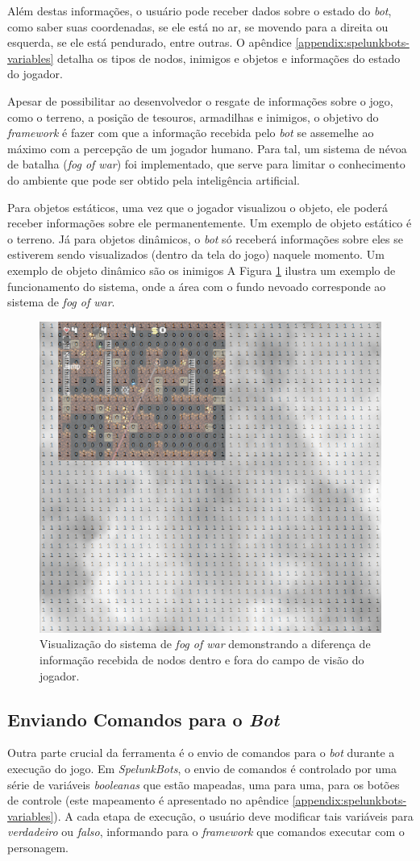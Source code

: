 Além destas informações, o usuário pode receber dados sobre o estado do
\textit{bot}, como saber suas coordenadas, se ele está no ar, se movendo para a
direita ou esquerda, se ele está pendurado, entre outras. O apêndice
\ref{appendix:spelunkbots-variables} detalha os tipos de nodos, inimigos e
objetos e informações do estado do jogador.

Apesar de possibilitar ao desenvolvedor o resgate de informações sobre o jogo,
como o terreno, a posição de tesouros, armadilhas e inimigos, o objetivo do
\textit{framework} é fazer com que a informação recebida pelo \textit{bot} se
assemelhe ao máximo com a percepção de um jogador humano. Para tal, um sistema
de névoa de batalha (\textit{fog of war}) foi implementado, que serve para
limitar o conhecimento do ambiente que pode ser obtido pela inteligência
artificial.

Para objetos estáticos, uma vez que o jogador visualizou o objeto, ele poderá
receber informações sobre ele permanentemente. Um exemplo de objeto estático é o
terreno. Já para objetos dinâmicos, o \textit{bot} só receberá informações sobre
eles se estiverem sendo visualizados (dentro da tela do jogo) naquele momento.
Um exemplo de objeto dinâmico são os inimigos A Figura \ref{fig:spelunkbots-fow}
ilustra um exemplo de funcionamento do sistema, onde a área com o fundo nevoado
corresponde ao sistema de \textit{fog of war}.

\begin{figure}[htb!]
\centering
\includegraphics[width=.60\textwidth]{fig/spelunkbots-fow.png}
\caption {Visualização do sistema de \textit{fog of war} demonstrando a
diferença de informação recebida de nodos dentro e fora do campo de visão do
jogador.}
\label{fig:spelunkbots-fow}
\end{figure}


\subsection{Enviando Comandos para o \textit{Bot}}
Outra parte crucial da ferramenta é o envio de comandos para o \textit{bot}
durante a execução do jogo. Em \textit{SpelunkBots}, o envio de comandos é
controlado por uma série de variáveis \textit{booleanas} que estão mapeadas, uma
para uma, para os botões de controle (este mapeamento é apresentado no apêndice
\ref{appendix:spelunkbots-variables}). A cada etapa de execução, o usuário deve
modificar tais variáveis para \textit{verdadeiro} ou \textit{falso}, informando
para o \textit{framework} que comandos executar com o personagem.

